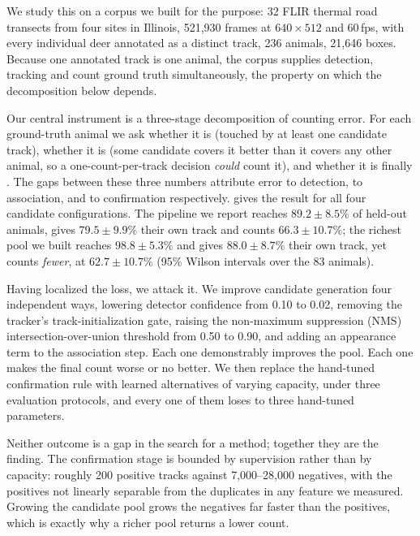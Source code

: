 We study this on a corpus we built for the purpose: 32 FLIR thermal road transects from
four sites in Illinois, 521,930 frames at $640\times512$ and 60\,fps, with every individual
deer annotated as a distinct track, 236 animals, 21,646 boxes. Because one annotated
track is one animal, the corpus supplies detection, tracking and count ground truth
simultaneously, the property on which the decomposition below depends.

Our central instrument is a three-stage decomposition of counting error. For each
ground-truth animal we ask whether it is \reachedq (touched by at least one candidate
track), whether it is \primaryq (some candidate covers it better than it covers any other
animal, so a one-count-per-track decision \emph{could} count it), and whether it is finally
\countedq. The gaps between these three numbers attribute error to detection, to
association, and to confirmation respectively.  gives the result for all four candidate configurations. The pipeline we
report reaches $89.2 \pm 8.5\%$ of held-out animals, gives $79.5 \pm 9.9\%$ their own track and
counts $66.3 \pm 10.7\%$; the richest pool we built reaches $98.8 \pm 5.3\%$ and gives
$88.0 \pm 8.7\%$ their own track, yet counts \emph{fewer}, at $62.7 \pm 10.7\%$ (95\% Wilson
intervals over the 83 animals).

Having localized the loss, we attack it. We improve candidate generation four independent
ways, lowering detector confidence from 0.10 to 0.02, removing the tracker's
track-initialization gate, raising the non-maximum suppression (NMS) intersection-over-union threshold from 0.50 to 0.90, and adding an appearance term to the association step. Each one demonstrably improves the
pool. Each one makes the final count worse or no better. We then replace the hand-tuned
confirmation rule with learned alternatives of varying capacity, under three evaluation
protocols, and every one of them loses to three hand-tuned parameters.

Neither outcome is a gap in the search for a method; together they are the finding. The
confirmation stage is bounded by supervision rather than by capacity: roughly 200 positive
tracks against 7,000--28,000 negatives, with the positives not linearly separable from
the duplicates in any feature we measured. Growing the candidate pool grows the negatives
far faster than the positives, which is exactly why a richer pool returns a lower count.

